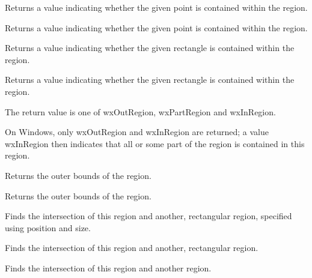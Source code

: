 Returns a value indicating whether the given point is contained within the region.


Returns a value indicating whether the given point is contained within the region.


Returns a value indicating whether the given rectangle is contained within the region.


Returns a value indicating whether the given rectangle is contained within the region.


The return value is one of wxOutRegion, wxPartRegion and wxInRegion.

On Windows, only wxOutRegion and wxInRegion are returned; a value wxInRegion then indicates that
all or some part of the region is contained in this region.

\label{wxregiongetbox}


Returns the outer bounds of the region.


Returns the outer bounds of the region.

\label{wxregionintersect}


Finds the intersection of this region and another, rectangular region, specified using position and size.


Finds the intersection of this region and another, rectangular region.


Finds the intersection of this region and another region.


